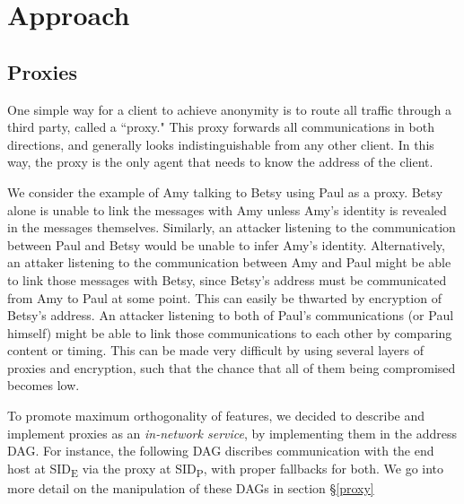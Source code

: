 \documentclass{article}
\newcommand{\entrynode}[1]{
  \SetVertexNormal[Shape      = circle,
                   FillColor  = black,
                   LineWidth  = 0pt,
                   MinSize    = 0pt]
  \Vertex[L={\tiny\,}]{#1}
  \SetVertexNormal[Shape      = circle,
                   FillColor  = white,
                   LineWidth  = 2pt]
}
\begin{document}
\section{Approach}
\label{approach}

\subsection{Proxies}
\label{proxies}
One simple way for a client to achieve anonymity is to route all traffic through a third party, called a ``proxy."  This proxy forwards all communications in both directions, and generally looks indistinguishable from any other client.  In this way, the proxy is the only agent that needs to know the address of the client.  

We consider the example of Amy talking to Betsy using Paul as a proxy.  Betsy alone is unable to link the messages with Amy unless Amy's identity is revealed in the messages themselves.  Similarly, an attacker listening to the communication between Paul and Betsy would be unable to infer Amy's identity.  Alternatively, an attaker listening to the communication between Amy and Paul might be able to link those messages with Betsy, since Betsy's address must be communicated from Amy to Paul at some point.  This can easily be thwarted by encryption of Betsy's address.  An attacker listening to both of Paul's communications (or Paul himself) might be able to link those communications to each other by comparing content or timing.  This can be made very difficult by using several layers of proxies and encryption, such that the chance that all of them being compromised becomes low.

To promote maximum orthogonality of features, we decided to describe and implement proxies as an {\em in-network service}, by implementing them in the address DAG.  For instance, the following DAG discribes communication with the end host at SID\textsubscript{E} via the proxy at SID\textsubscript{P}, with proper fallbacks for both.  We go into more detail on the manipulation of these DAGs in section \S\ref{proxy}

\end{document}
